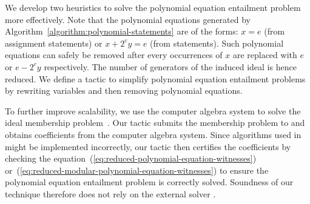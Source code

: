 We develop two heuristics to solve the polynomial equation
entailment problem more effectively. Note that the polynomial equations
generated by Algorithm~\ref{algorithm:polynomial-statements} are of the  
forms: $x = e$ (from assignment statements) or $x + 2^c y
= e$ (from  statements). Such polynomial equations can
safely be removed after every occurrences of $x$ are replaced with $e$
or $e - 2^c y$ respectively. The number of generators of the induced
ideal is hence reduced. We define a \coq
tactic to simplify polynomial equation entailment problems by 
rewriting variables and then removing polynomial equations.

To further improve scalability, we use the computer algebra system
\singular to solve the ideal membership problem~\cite{GP:08:SICA}. 
Our tactic submits the membership problem to \singular and 
obtains coefficients from the computer algebra system. 
Since algorithms used in \singular might be implemented incorrectly, 
our \coq
tactic then certifies the coefficients by checking the
equation~(\ref{eq:reduced-polynomial-equation-witnesses})
or~(\ref{eq:reduced-modular-polynomial-equation-witnesses}) to ensure
the polynomial equation entailment problem is correctly
solved. Soundness of our technique therefore does not rely on the
external solver \singular.

